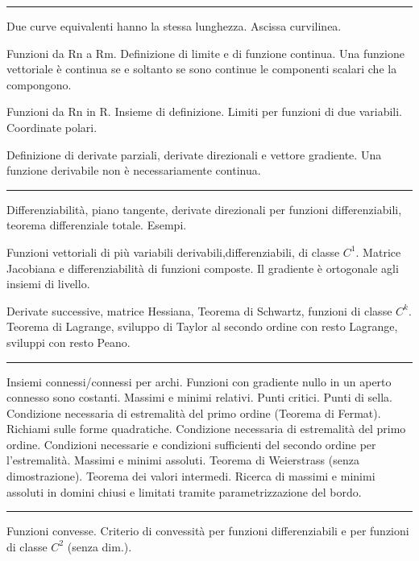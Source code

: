 \documentclass[a4paper,10pt]{article} %
\begin{document}
\begin{multicols}{2}
\bigbreak
\hrule
\bigbreak



Due curve equivalenti hanno la stessa lunghezza. Ascissa curvilinea.

Funzioni da Rn a Rm. Definizione di limite e di funzione continua. Una funzione vettoriale è continua se e soltanto se sono continue le componenti scalari che la compongono.

Funzioni da Rn in R. Insieme di definizione. Limiti per funzioni di due variabili. Coordinate polari.

Definizione di derivate parziali, derivate direzionali e vettore gradiente. Una funzione derivabile non è necessariamente continua.




\bigbreak
\hrule
\bigbreak




Differenziabilità, piano tangente, derivate direzionali per funzioni differenziabili, teorema differenziale totale. Esempi.

Funzioni vettoriali di più variabili derivabili,differenziabili, di classe $C^1$. Matrice Jacobiana e differenziabilità di funzioni composte. Il gradiente è ortogonale agli insiemi di livello.

Derivate successive, matrice Hessiana, Teorema di Schwartz, funzioni di classe $C^k$. Teorema di Lagrange, sviluppo di Taylor al secondo ordine con resto Lagrange, sviluppi con resto Peano.



\bigbreak
\hrule
\bigbreak



Insiemi connessi/connessi per archi. Funzioni con gradiente nullo in un aperto connesso sono costanti. Massimi e minimi relativi. Punti critici. Punti di sella. Condizione necessaria di estremalità del primo ordine (Teorema di Fermat). Richiami sulle forme quadratiche. Condizione necessaria di estremalità del primo ordine. Condizioni necessarie e condizioni sufficienti del secondo ordine per l'estremalità. Massimi e minimi assoluti. Teorema di Weierstrass (senza dimostrazione). Teorema dei valori intermedi. Ricerca di massimi e minimi assoluti in domini chiusi e limitati tramite parametrizzazione del bordo.




\bigbreak
\hrule
\bigbreak





Funzioni convesse. Criterio di convessità per funzioni differenziabili e per funzioni di classe $C^2$ (senza dim.).


\end{multicols}
\end{document}
